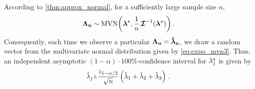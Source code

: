 \documentclass[
    11pt,
    extrafontsizes,
    article,
    oldfontcommands,
    final,
    oneside,
    openany,
    hidelinks]{memoir}
\begin{document}
According to \cref{thm:approx_normal}, for a sufficiently large sample size $n$,
\begin{equation}
\label{eq:expo_mvn3}
    \mathrm{\boldsymbol{\mathbf{\Lambda_n}}} \sim \mathrm{MVN}\biggl({\boldsymbol{\mathbf{\lambda}}}^{\star}, \frac{1}{n}\operatorname{\boldsymbol{\mathcal{I}}}^{-1}({\boldsymbol{\mathbf{\lambda}}}^{\star})\biggr)\,.
\end{equation}
Consequently, each time we observe a particular $\mathrm{\boldsymbol{\mathbf{\Lambda_n}}} = \boldsymbol{\mathbf{\hat{\boldsymbol{\mathbf{\lambda}}}_n}}$, we draw a random vector from the multivariate normal distribution given by \cref{eq:expo_mvn3}. Thus, an independent asymptotic $(1-\alpha) \cdot 100 \%$-confidence interval for ${\lambda}^{\star}_j$ is given by
\begin{equation}
    \estimator{\lambda}_j \raisebox{.2ex}{$\scriptstyle\pm$} \frac{z_{1 - \alpha/2}}{\sqrt n}
    \left (
        \estimator{\lambda}_1 + \estimator{\lambda}_2 + \estimator{\lambda}_3
    \right)\,.
\end{equation}
\end{document}
